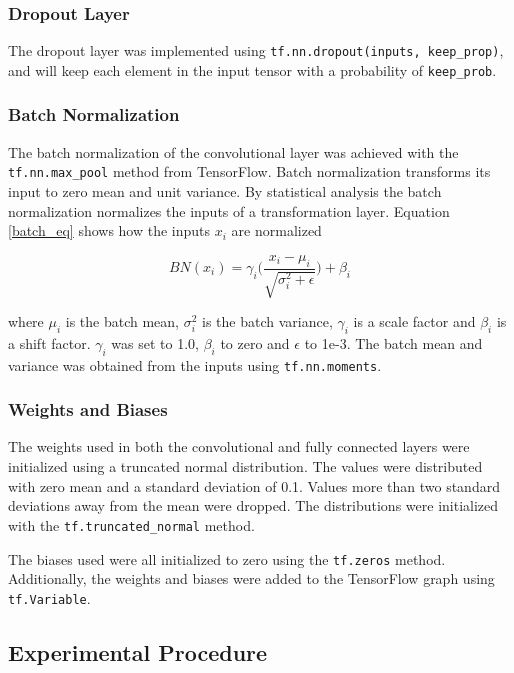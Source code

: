 \documentclass[]{article}
\begin{document}
\subsubsection{Dropout Layer}

The dropout layer was implemented using \texttt{tf.nn.dropout(inputs, keep\_prop)}, and will keep each element in the input tensor with a probability of \texttt{keep\_prob}. 

\subsubsection{Batch Normalization}

The batch normalization of the convolutional layer was achieved with the \texttt{tf.nn.max\_pool} method from TensorFlow. Batch normalization transforms its input to zero mean and unit variance. By statistical analysis the batch normalization normalizes the inputs of a transformation layer. Equation \ref{batch_eq} shows how the inputs \(x_i\) are normalized

\begin{equation} \label{batch_eq}
BN(x_i) = \gamma_i \Big( \frac{x_i - \mu_i}{\sqrt{\sigma_i^2 + \epsilon}} \Big) + \beta_i
\end{equation}

where \(\mu_i\) is the batch mean, \(\sigma_i^2\) is the batch variance, \(\gamma_i\) is a scale factor and \(\beta_i\) is a shift factor. \(\gamma_i\) was set to 1.0, \(\beta_i\) to zero and \(\epsilon\) to 1e-3. The batch mean and variance was obtained from the inputs using \texttt{tf.nn.moments}. 


\subsubsection{Weights and Biases} \label{weights}

The weights used in both the convolutional and fully connected layers were initialized using a truncated normal distribution. The values were distributed with zero mean and a standard deviation of 0.1. Values more than two standard deviations away from the mean were dropped. The distributions were initialized with the \texttt{tf.truncated\_normal} method. 

The biases used were all initialized to zero using the \texttt{tf.zeros} method. Additionally, the weights and biases were added to the TensorFlow graph using  \texttt{tf.Variable}.

\subsection{Experimental Procedure}
\end{document}
